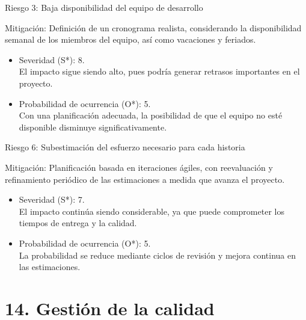 \documentclass[
11pt, %
]{charter}
\begin{document}
Riesgo 3: Baja disponibilidad del equipo de desarrollo

Mitigación: Definición de un cronograma realista, considerando la disponibilidad semanal de los miembros del equipo, así como vacaciones y feriados.
\begin{itemize}
	\item Severidad (S*): 8. \\
	El impacto sigue siendo alto, pues podría generar retrasos importantes en el proyecto.
	\item Probabilidad de ocurrencia (O*): 5. \\
	Con una planificación adecuada, la posibilidad de que el equipo no esté disponible disminuye significativamente.
\end{itemize}   

Riesgo 6: Subestimación del esfuerzo necesario para cada historia

Mitigación: Planificación basada en iteraciones ágiles, con reevaluación y refinamiento periódico de las estimaciones a medida que avanza el proyecto.
\begin{itemize}
	\item Severidad (S*): 7. \\
	El impacto continúa siendo considerable, ya que puede comprometer los tiempos de entrega y la calidad.
	\item Probabilidad de ocurrencia (O*): 5. \\
	La probabilidad se reduce mediante ciclos de revisión y mejora continua en las estimaciones.
\end{itemize}   


\section{14. Gestión de la calidad}
\label{sec:calidad}
\end{document}

